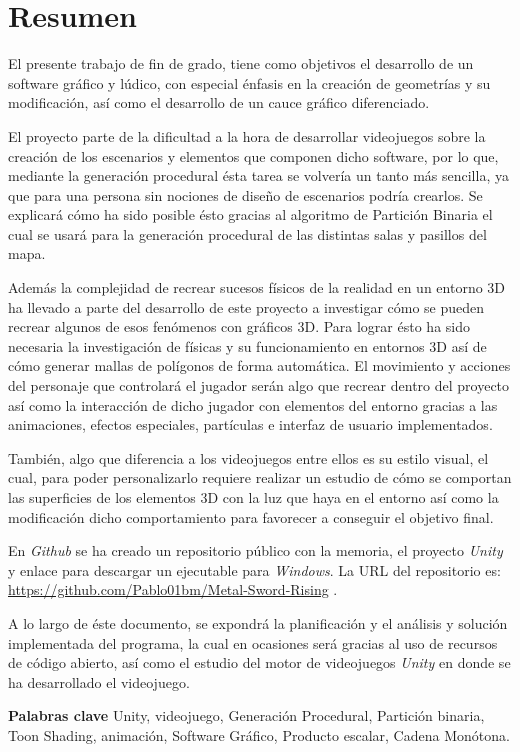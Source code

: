 \chapter{Resumen}
    El presente trabajo de fin de grado, tiene como objetivos el desarrollo de un software gráfico y lúdico, con especial énfasis en la creación de geometrías y su modificación, así como el desarrollo de un cauce gráfico diferenciado.

    El proyecto parte de la dificultad a la hora de desarrollar videojuegos sobre la creación de los escenarios y elementos que componen dicho software, por lo que, mediante la generación procedural ésta tarea se volvería un tanto más sencilla, ya que para una persona sin nociones de diseño de escenarios podría crearlos. Se explicará cómo ha sido posible ésto gracias al algoritmo de Partición Binaria el cual se usará para la generación procedural de las distintas salas y pasillos del mapa.
    
    Además la complejidad de recrear sucesos físicos de la realidad en un entorno 3D ha llevado a parte del desarrollo de este proyecto a investigar cómo se pueden recrear algunos de esos fenómenos con gráficos 3D. Para lograr ésto ha sido necesaria la investigación de físicas y su funcionamiento en entornos 3D así de cómo generar mallas de polígonos de forma automática.  El movimiento y acciones del personaje que controlará el jugador serán algo que recrear dentro del proyecto así como la interacción de dicho jugador con elementos del entorno gracias a las animaciones, efectos especiales, partículas e interfaz de usuario implementados.

    También, algo que diferencia a los videojuegos entre ellos es su estilo visual, el cual, para poder personalizarlo requiere realizar un estudio de cómo se comportan las superficies de los elementos 3D con la luz que haya en el entorno así como la modificación dicho comportamiento para favorecer a conseguir el objetivo final.

    En \textit{Github} se ha creado un repositorio público con la memoria, el proyecto \textit{Unity} y enlace para descargar un ejecutable para \textit{Windows}. La URL del repositorio es: \url{https://github.com/Pablo01bm/Metal-Sword-Rising} \cite{repositorioProyecto}.
    
    A lo largo de éste documento, se expondrá la planificación y el análisis y solución implementada del programa, la cual en ocasiones será gracias al uso de recursos de código abierto, así como el estudio del motor de videojuegos \textit{Unity} en donde se ha desarrollado el videojuego.

    \textbf{Palabras clave} Unity, videojuego, Generación Procedural, Partición binaria, Toon Shading, animación, Software Gráfico, Producto escalar, Cadena Monótona.
    